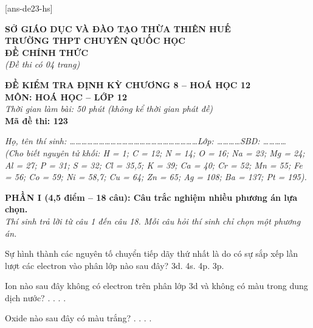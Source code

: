 \documentclass[11pt,a4paper]{article}
\def\loigiai#1{}
\begin{document}
[ans-de23-hs]

\noindent
\begin{minipage}[t]{0.48\textwidth}
	\textbf{SỞ GIÁO DỤC VÀ ĐÀO TẠO THỪA THIÊN HUẾ}\\
	\textbf{TRƯỜNG THPT CHUYÊN QUỐC HỌC}\\
	\textbf{ĐỀ CHÍNH THỨC}\\
	\textit{(Đề thi có 04 trang)}
\end{minipage}\hfill
\begin{minipage}[t]{0.48\textwidth}
	\raggedleft
	\textbf{\color{mainGreen}ĐỀ KIỂM TRA ĐỊNH KỲ CHƯƠNG 8 -- HOÁ HỌC 12}\\
	\textbf{MÔN: HOÁ HỌC -- LỚP 12}\\
	\textit{Thời gian làm bài: 50 phút (không kể thời gian phát đề)}\\
	\textbf{Mã đề thi: 123}
\end{minipage}


\vspace{1pt}
\noindent\textit{Họ, tên thí sinh: \dots\dots\dots\dots\dots\dots\dots\dots\dots\dots\dots\dots\dots\dots\dots\dots\dots\dots\dots\dots\dots\dots Lớp: \dots\dots\dots\dots SBD: \dots\dots\dots\dots}\\
\noindent\textit{(Cho biết nguyên tử khối: H = 1; C = 12; N = 14; O = 16; Na = 23; Mg = 24; Al = 27; P = 31; S = 32; Cl = 35,5; K = 39; Ca = 40; Cr = 52; Mn = 55; Fe = 56; Co = 59; Ni = 58,7; Cu = 64; Zn = 65; Ag = 108; Ba = 137; Pt = 195).}

\vspace{1pt}
\noindent
\textbf{PHẦN I (4,5 điểm -- 18 câu): Câu trắc nghiệm nhiều phương án lựa chọn.}\\
\textit{Thí sinh trả lời từ câu 1 đến câu 18. Mỗi câu hỏi thí sinh chỉ chọn một phương án.}

\begin{ex}
 Sự hình thành các nguyên tố chuyển tiếp dãy thứ nhất là do có sự sắp xếp lần lượt các electron vào phân lớp nào sau đây?
\choice
{3d.}
{4s.}
{4p.}
{3p.}
\loigiai{}
\end{ex}

\begin{ex}
 Ion nào sau đây không có electron trên phân lớp 3d và không có màu trong dung dịch nước?
\choice
{.}
{.}
{.}
{.}
\loigiai{}
\end{ex}

\begin{ex}
 Oxide nào sau đây có màu trắng?
\choice
{.}
{.}
{.}
{.}
\loigiai{}
\end{ex}
\end{document}
